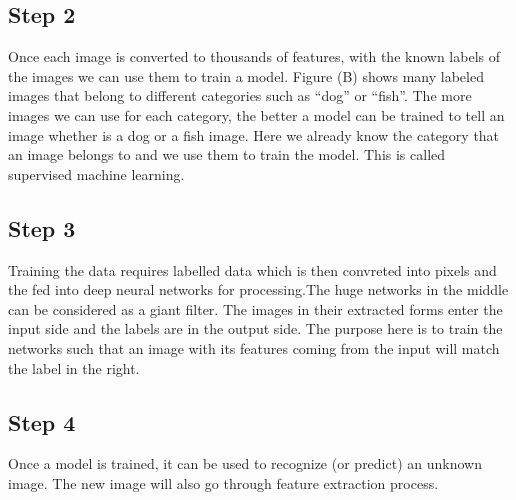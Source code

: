 \documentclass[12pt,letterpaper, onecolumn]{exam}
\begin{document}
    \subsection{Step 2}
        Once each image is converted to thousands of features, with the known labels of the images we can use them to train a model. Figure (B) shows many labeled images that belong to different categories such as “dog” or “fish”. The more images we can use for each category, the better a model can be trained to tell an image whether is a dog or a fish image. Here we already know the category that an image belongs to and we use them to train the model. This is called supervised machine learning.
    \subsection{Step 3}
        Training the data requires labelled data which is then convreted into pixels and the fed into deep neural networks for processing.The huge networks in the middle can be considered as a giant filter. The images in their extracted forms enter the input side and the labels are in the output side. The purpose here is to train the networks such that an image with its features coming from the input will match the label in the right.
    
    \subsection{Step 4}
    Once a model is trained, it can be used to recognize (or predict) an unknown image.
    The new image will also go through feature extraction process.
    
\end{document}
